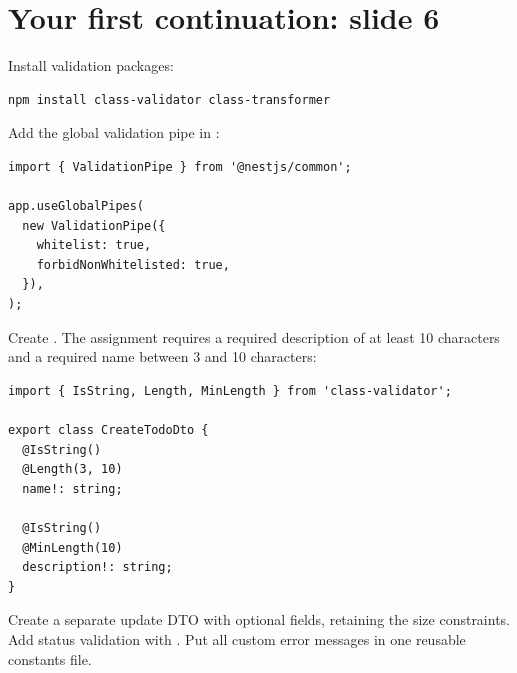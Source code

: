 \section{Your first continuation: slide 6}
Install validation packages:
\begin{lstlisting}[language={}]
npm install class-validator class-transformer
\end{lstlisting}
Add the global validation pipe in :
\begin{lstlisting}
import { ValidationPipe } from '@nestjs/common';

app.useGlobalPipes(
  new ValidationPipe({
    whitelist: true,
    forbidNonWhitelisted: true,
  }),
);
\end{lstlisting}
Create . The assignment requires a required description of at least 10 characters and a required name between 3 and 10 characters:
\begin{lstlisting}
import { IsString, Length, MinLength } from 'class-validator';

export class CreateTodoDto {
  @IsString()
  @Length(3, 10)
  name!: string;

  @IsString()
  @MinLength(10)
  description!: string;
}
\end{lstlisting}
Create a separate update DTO with optional fields, retaining the size constraints. Add status validation with . Put all custom error messages in one reusable constants file.

